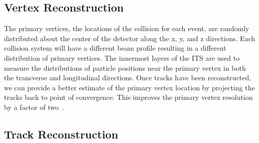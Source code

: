 \subsection*{Vertex Reconstruction}

The primary vertices, the locations of the collision for each event, are randomly distributed about the center of the detector along the x, y, and z directions. Each collision system will have a different beam profile resulting in a different distribution of primary vertices. The innermost layers of the ITS are used to measure the distributions of particle positions near the primary vertex in both the transverse and longitudinal directions. Once tracks have been reconstructed, we can provide a better estimate of the primary vertex location by projecting the tracks back to point of convergence. This improves the primary vertex resolution by a factor of two~\cite{trackVertexReconstruction}.

\subsection*{Track Reconstruction}

